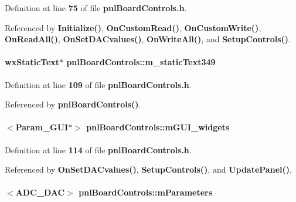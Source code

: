 Definition at line {\bf 75} of file {\bf pnl\+Board\+Controls.\+h}.



Referenced by {\bf Initialize()}, {\bf On\+Custom\+Read()}, {\bf On\+Custom\+Write()}, {\bf On\+Read\+All()}, {\bf On\+Set\+D\+A\+Cvalues()}, {\bf On\+Write\+All()}, and {\bf Setup\+Controls()}.

\paragraph[{m\+\_\+static\+Text349}]{\setlength{\rightskip}{0pt plus 5cm}wx\+Static\+Text$\ast$ pnl\+Board\+Controls\+::m\+\_\+static\+Text349\hspace{0.3cm}{\ttfamily [protected]}}\label{classpnlBoardControls_a0a893eb9cce1c3bfab35d3085f45c4ff}


Definition at line {\bf 109} of file {\bf pnl\+Board\+Controls.\+h}.



Referenced by {\bf pnl\+Board\+Controls()}.

\paragraph[{m\+G\+U\+I\+\_\+widgets}]{$<${\bf Param\+\_\+\+G\+UI}$\ast$$>$ pnl\+Board\+Controls\+::m\+G\+U\+I\+\_\+widgets\hspace{0.3cm}{\ttfamily [protected]}}\label{classpnlBoardControls_a74a936a4a239bf1bf386768a539b7540}


Definition at line {\bf 114} of file {\bf pnl\+Board\+Controls.\+h}.



Referenced by {\bf On\+Set\+D\+A\+Cvalues()}, {\bf Setup\+Controls()}, and {\bf Update\+Panel()}.

\paragraph[{m\+Parameters}]{$<${\bf A\+D\+C\+\_\+\+D\+AC}$>$ pnl\+Board\+Controls\+::m\+Parameters\hspace{0.3cm}{\ttfamily [protected]}}\label{classpnlBoardControls_a6fe1622849ebc04db81ca7ef71aea999}


